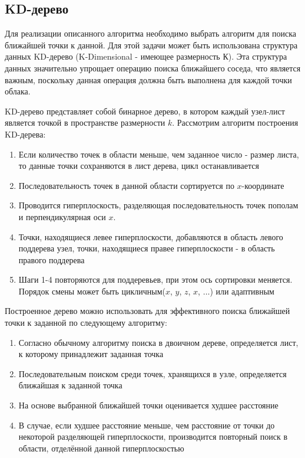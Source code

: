 \subsection{KD-дерево}

Для реализации описанного алгоритма необходимо выбрать алгоритм для поиска
ближайшей точки к данной. Для этой задачи может быть использована структура
данных KD-дерево (K-Dimensional - имеющее размерность
К)\cite[23]{PointCloudAnalysis}. Эта структура данных значительно упрощает
операцию поиска ближайшего соседа, что является важным, поскольку данная
операция должна быть выполнена для каждой точки облака.

KD-дерево представляет собой бинарное дерево, в котором каждый узел-лист
является точкой в пространстве размерности $k$. Рассмотрим алгоритм построения
KD-дерева:

\begin{enumerate}
    \item Если количество точек в области меньше, чем заданное число - размер
    листа, то данные точки сохраняются в лист дерева, цикл останавливается
    \item Последовательность точек в данной области сортируется по
    $x$-координате
    \item Проводится гиперплоскость, разделяющая последовательность точек
    пополам и перпендикулярная оси $x$.
    \item Точки, находящиеся левее гиперплоскости, добавляются в область левого
    поддерева узел, точки, находящиеся правее гиперплоскости - в область правого
    поддерева
    \item Шаги 1-4 повторяются для поддеревьев, при этом ось сортировки
    меняется. Порядок смены может быть цикличным($x$, $y$, $z$, $x$, $\dots$)
    или адаптивным
\end{enumerate}

Построенное дерево можно использовать для эффективного поиска ближайшей точки к
заданной по следующему алгоритму:

\begin{enumerate}
    \item Согласно обычному алгоритму поиска в двоичном дереве, определяется
    лист, к которому принадлежит заданная точка
    \item Последовательным поиском среди точек, хранящихся в узле, определяется
    ближайшая к заданной точка
    \item На основе выбранной ближайшей точки оценивается худшее расстояние
    \item В случае, если худшее расстояние меньше, чем расстояние от точки до
    некоторой разделяющей гиперплоскости, производится повторный поиск в
    области, отделённой данной гиперплоскостью
\end{enumerate}

